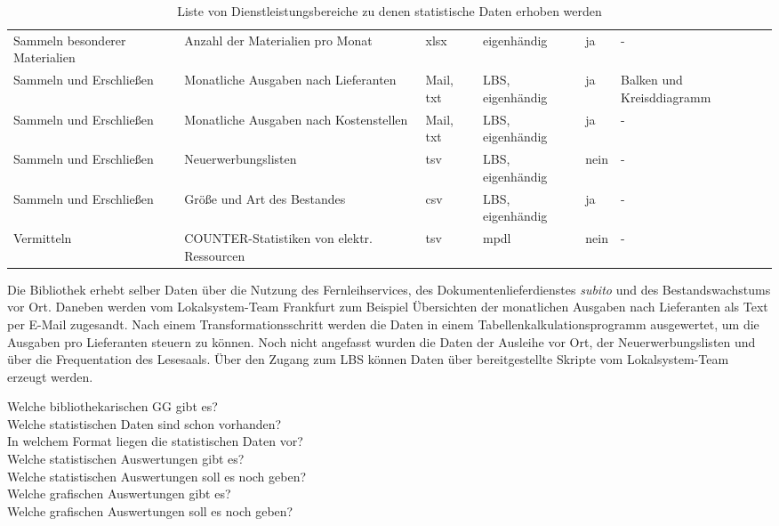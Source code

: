 \begin{table}[h]
\begin{adjustbox}{max width=\textwidth}
\begin{tabular}{llllll}
            Sammeln besonderer Materialien  & Anzahl der Materialien pro Monat          & xlsx          & eigenhändig               & ja    & -\\
            Sammeln und Erschließen         & Monatliche Ausgaben nach Lieferanten      & Mail, txt     & LBS, eigenhändig          & ja    & Balken und Kreisddiagramm\\ 
            Sammeln und Erschließen         & Monatliche Ausgaben nach Kostenstellen    & Mail, txt     & LBS, eigenhändig          & ja    & -\\ 
            Sammeln und Erschließen         & Neuerwerbungslisten                       & tsv           & LBS, eigenhändig          & nein  & -\\ 
            Sammeln und Erschließen         & Größe und Art des Bestandes               & csv           & LBS, eigenhändig          & ja    & -\\ 
            Vermitteln                      & COUNTER-Statistiken von elektr. Ressourcen& tsv           & mpdl                      & nein  & -\\ 
        \bottomrule
    \end{tabular}
    \end{adjustbox}
    \caption{%
        Liste von Dienstleistungsbereiche zu denen statistische Daten erhoben werden
    \label{tab:Statistische_Daten}
    }
     \end{table}
\endgroup


Die Bibliothek  erhebt selber Daten über die Nutzung des Fernleihservices, 
des Dokumentenlieferdienstes \textit{subito} und des Bestandswachstums vor Ort.
Daneben werden vom Lokalsystem-Team Frankfurt zum Beispiel Übersichten der monatlichen Ausgaben nach Lieferanten
als Text per E-Mail zugesandt. Nach einem Transformationsschritt werden die Daten in einem Tabellenkalkulationsprogramm 
ausgewertet, um die Ausgaben pro Lieferanten steuern zu können.
Noch nicht angefasst wurden die Daten der Ausleihe vor Ort, der Neuerwerbungslisten und über die Frequentation des Lesesaals.
Über den Zugang zum LBS können Daten über bereitgestellte Skripte vom Lokalsystem-Team erzeugt werden. 



\clearpage
Welche bibliothekarischen GG gibt es?\\
Welche statistischen Daten sind schon vorhanden?\\
In welchem Format liegen die statistischen Daten vor?\\
Welche statistischen Auswertungen gibt es?\\
Welche statistischen Auswertungen soll es noch geben?\\
Welche grafischen Auswertungen gibt es?\\
Welche grafischen Auswertungen soll es noch geben?



